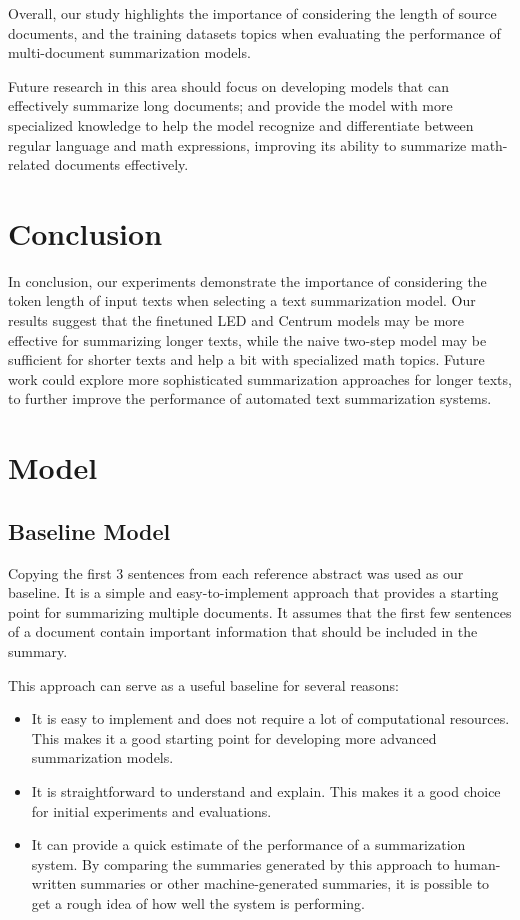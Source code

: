 \documentclass[12pt, twocolumn]{article}
\numberwithin{equation}{section}
\begin{document}
Overall, our study highlights the importance of considering the length of source documents, and the training datasets topics when evaluating the performance of multi-document summarization models.

Future research in this area should focus on developing models that can effectively summarize long documents; and provide the model with more specialized knowledge to help the model recognize and differentiate between regular language and math expressions, improving its ability to summarize math-related documents effectively.

\section{Conclusion}
\label{sec:conclusion}

In conclusion, our experiments demonstrate the importance of considering the token length of input texts when selecting a text summarization model. Our results suggest that the finetuned LED and Centrum models may be more effective for summarizing longer texts, while the naive two-step model may be sufficient for shorter texts and help a bit with specialized math topics. Future work could explore more sophisticated summarization approaches for longer texts, to further improve the performance of automated text summarization systems.

\appendix

\section{Model}
\label{app:model}

\subsection{Baseline Model}
\label{app:model-baseline}

Copying the first 3 sentences from each reference abstract was used as our baseline. It is a simple and easy-to-implement approach that provides a starting point for summarizing multiple documents. It assumes that the first few sentences of a document contain important information that should be included in the summary.

This approach can serve as a useful baseline for several reasons:

\begin{itemize}
    \item It is easy to implement and does not require a lot of computational resources. This makes it a good starting point for developing more advanced summarization models.
    \item It is straightforward to understand and explain. This makes it a good choice for initial experiments and evaluations.
    \item It can provide a quick estimate of the performance of a summarization system. By comparing the summaries generated by this approach to human-written summaries or other machine-generated summaries, it is possible to get a rough idea of how well the system is performing.
\end{itemize}
\end{document}
